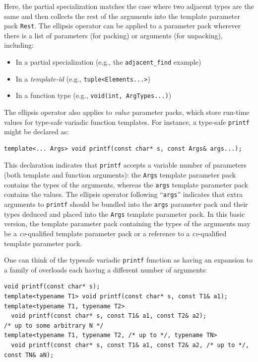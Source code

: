 \documentclass{article}
\begin{document}
Here, the partial specialization matches the case where two adjacent
types are the same and then collects the rest of the arguments into
the template parameter pack \texttt{Rest}. The ellipsis operator can
be applied to a parameter pack wherever there is a list of parameters
(for packing) or arguments (for unpacking), including:
\begin{itemize}
  \item In a partial specialization (e.g., the \texttt{adjacent\_find} example)
  \item In a \textit{template-id} (e.g., \texttt{tuple<Elements...>})
  \item In a function type (e.g., \texttt{void(int, ArgTypes...)})
\end{itemize}

The ellipsis operator also applies to \textit{value} parameter packs,
which store run-time values for type-safe variadic function
templates. For instance, a type-safe \texttt{printf} might be declared
as:

\begin{verbatim}
template<... Args> void printf(const char* s, const Args& args...);
\end{verbatim}

This declaration indicates that \texttt{printf} accepts a variable
number of parameters (both template and function arguments): the
\texttt{Args} template parameter pack contains the types of the
arguments, whereas the \texttt{args} template parameter pack contains
the values. The ellipsis operator following ``\texttt{args}''
indicates that extra arguments to \texttt{printf} should be bundled
into the \texttt{args} parameter pack and their types deduced and
placed into the \texttt{Args} template parameter pack. In this basic
version, the template parameter pack containing the types of the
arguments may be a \textit{cv}-qualified template parameter pack or a
reference to a \textit{cv}-qualified template parameter pack. 

One can think of the typesafe variadic \texttt{printf} function as
having an expansion to a family of overloads each having a different
number of arguments:

\begin{verbatim}
void printf(const char* s);
template<typename T1> void printf(const char* s, const T1& a1);
template<typename T1, typename T2> 
  void printf(const char* s, const T1& a1, const T2& a2);
/* up to some arbitrary N */
template<typename T1, typename T2, /* up to */, typename TN> 
  void printf(const char* s, const T1& a1, const T2& a2, /* up to */, const TN& aN);
\end{verbatim}
\end{document}
